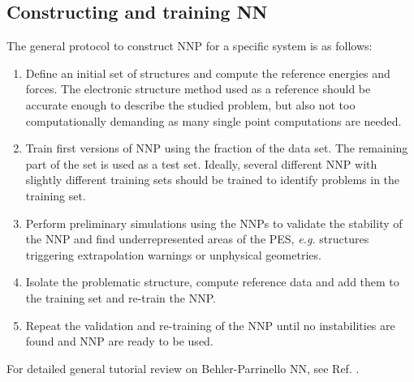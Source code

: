 \documentclass[12pt]{article}
\begin{document}
%
%
\subsection{Constructing and training NN}
The general protocol to construct NNP for a specific system is as follows:
\begin{enumerate}
    \item Define an initial set of structures and compute the reference energies and forces. The electronic structure method used as a reference should be accurate enough to describe the studied problem, but also not too computationally demanding as many single point computations are needed.
    \item Train first versions of NNP using the fraction of the data set. The remaining part of the set is used as a test set. Ideally, several different NNP with slightly different training sets should be trained to identify problems in the training set.
    \item Perform preliminary simulations using the NNPs to validate the stability of the NNP and find underrepresented areas of the PES, \textit{e.g.} structures triggering extrapolation warnings or unphysical geometries.
    \item Isolate the problematic structure, compute reference data and add them to the training set and re-train the NNP.
    \item Repeat the validation and re-training of the NNP until no instabilities are found and NNP are ready to be used.
\end{enumerate}

For detailed general tutorial review on Behler-Parrinello NN, see Ref. . 
\end{document}
